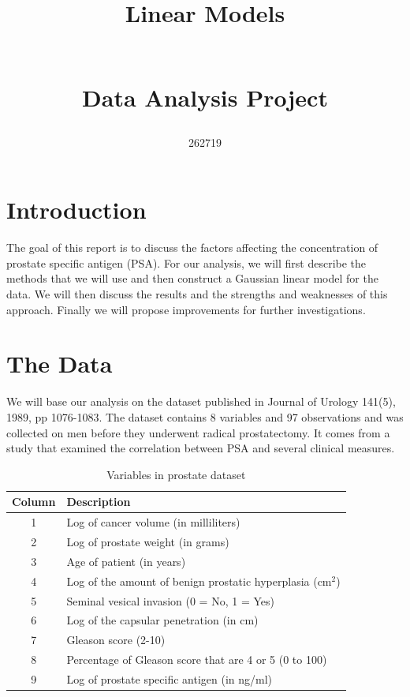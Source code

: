 \documentclass[10pt]{article}
\author{262719}
\title{\begin{huge}
Linear Models
\end{huge}\\Data Analysis Project}
\date{}
\begin{document}
\maketitle
 
\tableofcontents
\newpage

\section{Introduction}
\quad The goal of this report is to discuss the factors affecting the concentration of prostate specific antigen (PSA). For our analysis, we will first describe the methods that we will use and then construct a Gaussian linear model for the data. We will then discuss the results and the strengths and weaknesses of this approach. Finally we will propose improvements for further investigations.

\section{The Data}
\quad We will base our analysis on the dataset published in Journal of Urology 141(5), 1989, pp 1076-1083. The dataset contains 8 variables and 97 observations and was collected on men before they underwent radical prostatectomy. It comes from a study that examined the correlation between PSA and several clinical measures. 

\begin{table}[ht]
\centering
\caption{Variables in prostate dataset} \label{datadescript}
\begin{tabular}{cl}
  \hline
 Column & Description \\ 
  \hline
1 & Log of cancer volume (in milliliters) \\
2 & Log of prostate weight (in grams)  \\
3 & Age of patient (in years)  \\
4 & Log of the amount of benign prostatic hyperplasia (cm${^2}$) \\
5 & Seminal vesical invasion (0 = No, 1 = Yes)  \\
6 & Log of the capsular penetration (in cm)  \\
7 & Gleason score (2-10)  \\
8 & Percentage of Gleason score that are 4 or 5 (0 to 100) \\ 
9 & Log of prostate specific antigen (in ng/ml) \\
   \hline
\end{tabular}
\end{table}
\end{document}
